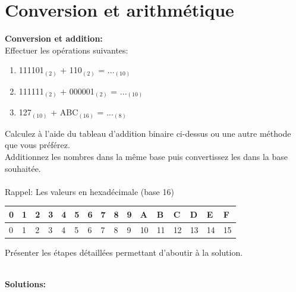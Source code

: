 \section{Conversion et arithmétique}
\begin{Exercice}[20 minutes] \textbf{Conversion et addition:}\\
    Effectuer les opérations suivantes:
    \begin{enumerate}
        \item 111101$_{(2)}$ + 110$_{(2)}$ = ...$_{(10)}$
        \item 111111$_{(2)}$ + 000001$_{(2)}$ = ...$_{(10)}$
        \item 127$_{(10)}$ + ABC$_{(16)}$ = ...$_{(8)}$
    \end{enumerate}
    \begin{conseil}
        Calculez à l'aide du tableau d'addition binaire ci-dessus ou une autre méthode que vous préférez.\\
        Additionnez les nombres dans la même base puis convertissez les dans la base souhaitée.\\\\
        Rappel: Les valeurs en hexadécimale (base 16)\\
        \begin{tabular}{| C{0.030\textwidth} | C{0.030\textwidth} | C{0.030\textwidth} | C{0.030\textwidth} | C{0.030\textwidth} | C{0.030\textwidth} | C{0.030\textwidth} | C{0.030\textwidth} | C{0.030\textwidth} | C{0.030\textwidth} | C{0.030\textwidth} | C{0.030\textwidth} | C{0.030\textwidth} | C{0.030\textwidth} | C{0.030\textwidth} | C{0.030\textwidth} |} 
            \hline
            \textbf{0} & \textbf{1} & \textbf{2} & \textbf{3} & \textbf{4} & \textbf{5} & \textbf{6} & \textbf{7} & \textbf{8} & \textbf{9} & \textbf{A} & \textbf{B} & \textbf{C} & \textbf{D} & \textbf{E} & \textbf{F}\\ [0.5ex]
             & 1 & 2 & 3 & 4 & 5 & 6 & 7 & 8 & 9 & 10 & 11 & 12 & 13 & 14 & 15 \\ [0.5ex] 
            \hline

        \end{tabular}        
    \end{conseil}
    \begin{solution}
        Présenter les étapes détaillées permettant d'aboutir à la solution.
    \end{solution}
    \textbf{\\ \faTerminal  Solutions:}
    

\end{Exercice}
